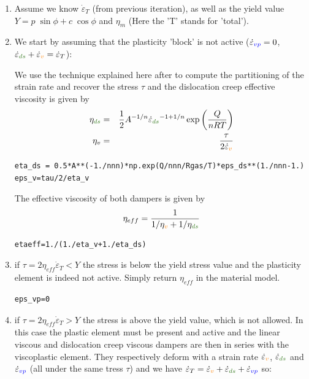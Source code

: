 \begin{enumerate}
\item Assume we know $\dot\varepsilon_T$ (from previous iteration), 
as well as the yield value  $Y = p\; \sin\phi + c \; \cos \phi$ and $\eta_m$ (Here the 'T' stands 
for 'total').

\item We start by assuming that the plasticity 'block' is not active 
($\dot{\varepsilon}_{\color{blue}vp}=0$, $\dot{\varepsilon}_{\color{OliveGreen}ds}
+\dot{\varepsilon}_{\color{orange} v} =\dot{\varepsilon}_T$): 

We use the technique explained here after to compute the partitioning of the strain rate
and recover the stress $\tau$ and the dislocation creep effective viscosity
is given by 
\begin{eqnarray}
\eta_{\color{OliveGreen}ds} &=& \frac{1}{2} A^{-1/n} 
\dot{\varepsilon}_{\color{OliveGreen}ds}^{-1+1/n} \exp \left( \frac{Q}{nRT} \right) \nn\\
\eta_v &=& \frac{\tau}{2 \dot{\varepsilon}_{\color{orange}v}}  \nn
\end{eqnarray}
\begin{lstlisting}
eta_ds = 0.5*A**(-1./nnn)*np.exp(Q/nnn/Rgas/T)*eps_ds**(1./nnn-1.)
eps_v=tau/2/eta_v
\end{lstlisting}
The effective viscosity of both dampers is given by 
\[
\eta_{eff}=\frac{1}{1/\eta_{\color{orange}v}+1/\eta_{\color{OliveGreen}ds}}
\]
\begin{lstlisting}
etaeff=1./(1./eta_v+1./eta_ds)
\end{lstlisting}

\item if $\tau =2 {\eta}_{eff} \dot\varepsilon_T < Y$ the stress is below the yield stress value 
and the plasticity element is indeed not active. 
Simply return ${\eta}_{eff}$ in the material model.
\begin{lstlisting}
eps_vp=0
\end{lstlisting}

\item if $\tau=2 \eta_{eff} \dot\varepsilon_T > Y$ the stress is above the 
yield value, which is not allowed. In this case the plastic element must be present 
and active and the linear viscous and dislocation creep viscous dampers are then 
in series with the viscoplastic element. 
They  respectively deform with a strain rate $\dot{\varepsilon}_{\color{orange}v}$, 
$\dot{\varepsilon}_{\color{OliveGreen}ds}$ and $\dot\varepsilon_{\color{blue}vp}$ 
(all under the same tress $\tau$) 
and we have  
$\dot\varepsilon_T = \dot{\varepsilon}_{\color{orange}v} +
\dot{\varepsilon}_{\color{OliveGreen}ds} + \dot\varepsilon_{\color{blue}vp}$ so:


\end{enumerate}
